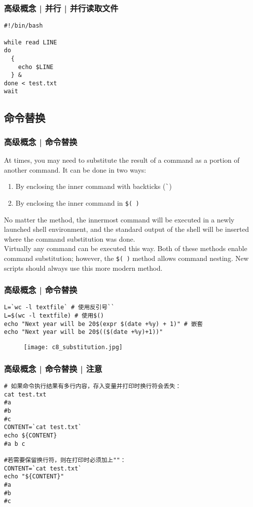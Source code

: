\begin{frame}[fragile]
  \frametitle{高级概念 | 并行 | 并行读取文件}
  \vspace{-0.5em}
\begin{lstlisting}
#!/bin/bash

while read LINE
do
  {
    echo $LINE
  } &
done < test.txt
wait
\end{lstlisting}
\end{frame}

\subsection{命令替换}
\begin{frame}[fragile]
  \frametitle{高级概念 | 命令替换}
  At times, you may need to substitute the result of a command as a portion of another command. It can be done in two ways:
  \begin{enumerate}
    \item By enclosing the inner command with backticks (\verb|`|)
    \item By enclosing the inner command in \verb|$( )|
  \end{enumerate}
  No matter the method, the innermost command will be executed in a newly launched shell environment, and the standard output of the shell will be inserted where the command substitution was done.\\
  \vspace{0.3cm}
  Virtually any command can be executed this way. Both of these methods enable command substitution; however, the \verb|$( )| method allows command nesting. New scripts should always use this more modern method.
\end{frame}

\begin{frame}[fragile]
  \frametitle{高级概念 | \alert{命令替换}}
\begin{lstlisting}
L=`wc -l textfile` # 使用反引号``
L=$(wc -l textfile) # 使用$()
echo "Next year will be 20$(expr $(date +%y) + 1)" # 嵌套
echo "Next year will be 20$(($(date +%y)+1))"
\end{lstlisting}
\vspace{-0.5em}
  \begin{figure}
    \centering
    \texttt{[image: c8\_substitution.jpg]}
  \end{figure}
\end{frame}

\begin{frame}[fragile]
  \frametitle{高级概念 | 命令替换 | \alert{注意}}
  \vspace{-0.5em}
\begin{lstlisting}
# 如果命令执行结果有多行内容，存入变量并打印时换行符会丢失：
cat test.txt
#a
#b
#c
CONTENT=`cat test.txt`
echo ${CONTENT}
#a b c

#若需要保留换行符，则在打印时必须加上""：
CONTENT=`cat test.txt`
echo "${CONTENT}"
#a
#b
#c
\end{lstlisting}
\end{frame}

